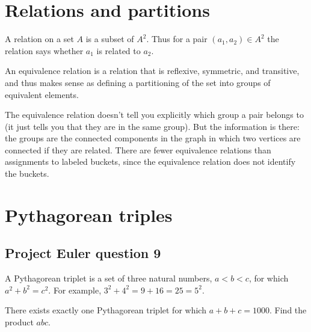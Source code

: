 \newpage
\section{Relations and partitions}
A relation on a set $A$ is a subset of $A^2$. Thus for a pair
$(a_1, a_2) \in A^2$ the relation says whether $a_1$ is related to $a_2$.

An equivalence relation is a relation that is reflexive, symmetric, and
transitive, and thus makes sense as defining a partitioning of the set into
groups of equivalent elements.

The equivalence relation doesn't tell you explicitly which group a pair belongs
to (it just tells you that they are in the same group). But the information is
there: the groups are the connected components in the graph in which two
vertices are connected if they are related. There are fewer equivalence
relations than assignments to labeled buckets, since the equivalence relation
does not identify the buckets. 


\newpage
\section{Pythagorean triples}

\subsection*{Project Euler question 9}

\begin{mdframed}
  A Pythagorean triplet is a set of three natural numbers, $a < b < c$, for which
  $a^2 + b^2 = c^2$.  For example, $3^2 + 4^2 = 9 + 16 = 25 = 5^2$.

  There exists exactly one Pythagorean triplet for which $a + b + c = 1000$.  Find the product
  $abc$.
\end{mdframed}

